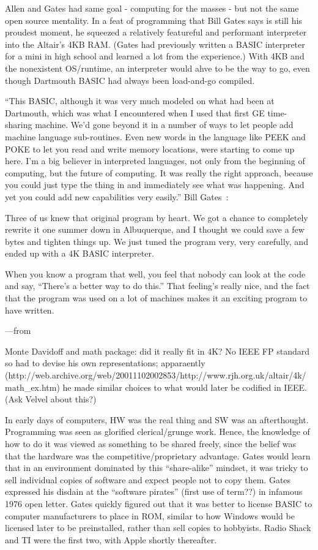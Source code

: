 \documentclass{article}
\begin{document}
Allen and Gates had same goal - computing for the masses - but not the
same open source mentality.  In a feat of programming that Bill Gates
says is still his proudest moment, he squeezed a relatively featureful
and performant interpreter into the Altair's 4KB RAM.  (Gates had
previously written a BASIC interpreter for  a mini in high school and
learned a lot from the experience.)  With 4KB and the nonexistent
OS/runtime, an interpreter would ahve to be the way to go, even though
Dartmouth BASIC had always been load-and-go compiled.


``This BASIC, although it was very much modeled on what had been at
Dartmouth, which was what I encountered when I used that first GE
time-sharing machine. We'd gone beyond it in a number of ways to let
people add machine language sub-routines. Even new words in the language
like PEEK and POKE to let you read and write memory locations, were
starting to come up here. I'm a big believer in interpreted languages,
not only from the beginning of computing, but the future of
computing. It was really the right approach, because you could just type
the thing in and immediately see what was happening. And yet you could
add new capabilities very easily.'' Bill Gates~\cite{smithsonian_interview}:


Three of us knew that original program by heart. We got a chance to
completely rewrite it one summer down in Albuquerque, and I thought we
could save a few bytes and tighten things up. We just tuned the program
very, very carefully, and ended up with a 4K BASIC interpreter.

When you know a program that well, you feel that nobody can look at the
code and say, ``There's a better way to do this.'' That feeling's really
nice, and the fact that the program was used on a lot of machines makes
it an exciting program to have written.

---from \cite{programmers_at_work}


Monte Davidoff and math package: did it really fit in 4K?  No IEEE FP
standard so had to devise his own representations; apparaently
(http://web.archive.org/web/20011102002853/http://www.rjh.org.uk/altair/4k/math\_ex.htm)
he made similar choices to what would later be codified in IEEE.  (Ask
Velvel about this?)


In early days of computers, HW was the real thing and SW was an
afterthought.  Programming was seen as glorified clerical/grunge work.
Hence, the knowledge of how to do it was viewed as something to be
shared freely, since the belief was that the hardware was the
competitive/proprietary advantage.
Gates would learn that in an environment dominated by this
``share-alike'' mindset, it was
tricky to sell individual copies of software and expect people not to
copy them.  Gates
expressed his disdain at the ``software pirates'' (first use of term??) in infamous
1976 open letter.
Gates quickly figured out that it was better to license BASIC to
computer manufacturers to place in ROM, similar to how Windows would be
licensed later to be preinstalled, rather than sell copies to
hobbyists.  Radio Shack and TI were the first two, with Apple shortly
thereafter.  
\end{document}
